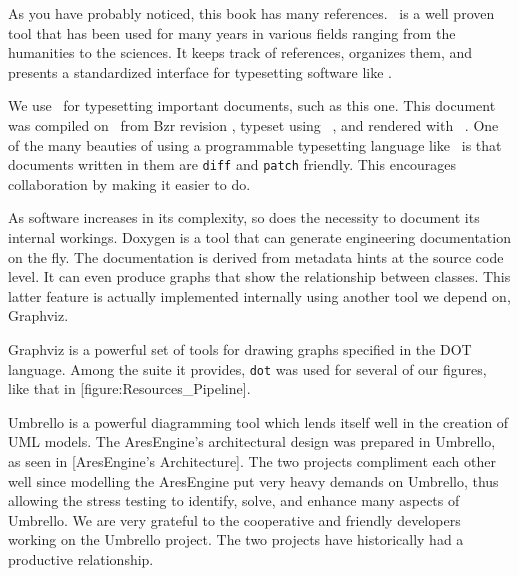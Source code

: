 

\startitemize[4]
\head {\em \BIBTEX}

As you have probably noticed, this book has many references. \BIBTEX\ is a well proven tool that has been used for many years in various fields ranging from the humanities to the sciences. It keeps track of references, organizes them, and presents a standardized interface for typesetting software like \CONTEXT.

\head {\em \CONTEXT}

We use \CONTEXT\ for typesetting important documents, such as this one. This document was compiled on \currentdate\ from Bzr revision \BzrRevisionClickable, typeset using \CONTEXT\ \contextversion, and rendered with \texenginename\ \texengineversion. One of the many beauties of using a programmable typesetting language like \CONTEXT\ is that documents written in them are {\tt diff} and {\tt patch} friendly. This encourages collaboration by making it easier to do.


As software increases in its complexity, so does the necessity to document its internal workings. Doxygen is a tool that can generate engineering documentation on the fly. The documentation is derived from metadata hints at the source code level. It can even produce graphs that show the relationship between classes. This latter feature is actually implemented internally using another tool we depend on, Graphviz.


Graphviz is a powerful set of tools for drawing graphs specified in the DOT language. Among the suite it provides, {\tt dot} was used for several of our figures, like that in [figure:Resources_Pipeline].


Umbrello is a powerful diagramming tool which lends itself well in the creation of UML models. The AresEngine's architectural design was prepared in Umbrello, as seen in [AresEngine's Architecture]. The two projects compliment each other well since modelling the AresEngine put very heavy demands on Umbrello, thus allowing the stress testing to identify, solve, and enhance many aspects of Umbrello. We are very grateful to the cooperative and friendly developers working on the Umbrello project. The two projects have historically had a productive relationship.
\stopitemize

